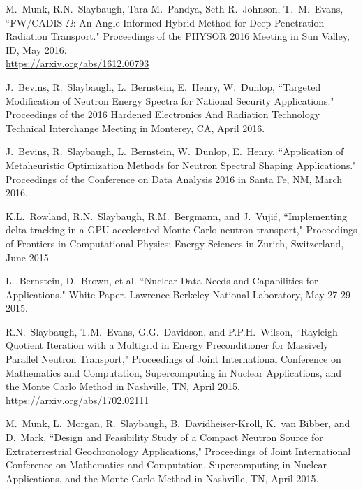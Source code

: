 \begin{bibsection}
\item M.\ Munk, R.N.\ Slaybaugh, Tara M.~Pandya, Seth R.~Johnson, T.~M.~Evans, ``FW/CADIS-$\Omega$: An Angle-Informed Hybrid Method for Deep-Penetration Radiation Transport." Proceedings of the PHYSOR 2016 Meeting in Sun Valley, ID, May 2016.\\
\url{https://arxiv.org/abs/1612.00793}

\item J.\ Bevins, R.\ Slaybaugh, L.\ Bernstein, E.\ Henry, W.\ Dunlop, ``Targeted Modification of Neutron Energy Spectra for National Security Applications." Proceedings of the 2016 Hardened Electronics And Radiation Technology Technical Interchange Meeting in Monterey, CA, April 2016. 

\item J.\ Bevins, R.\ Slaybaugh, L.\ Bernstein, W.\ Dunlop, E.\ Henry, ``Application of Metaheuristic Optimization Methods for Neutron Spectral Shaping Applications." Proceedings of the Conference on Data Analysis 2016 in Santa Fe, NM, March 2016. 

\item K.L.\ Rowland, R.N.\ Slaybaugh, R.M.\ Bergmann, and J.\ Vuji\'c, ``Implementing delta-tracking in a GPU-accelerated Monte Carlo neutron transport," Proceedings of Frontiers in Computational Physics: Energy Sciences in Zurich, Switzerland, June 2015. 

\item L.\ Bernstein, D.\ Brown, et al. ``Nuclear Data Needs and Capabilities for Applications." White Paper. Lawrence Berkeley National Laboratory, May 27-29 2015. 

\item  R.N.\ Slaybaugh, T.M.\ Evans, G.G.\ Davidson, and P.P.H.\ Wilson, ``Rayleigh Quotient Iteration with a Multigrid in Energy Preconditioner for Massively Parallel Neutron Transport," Proceedings of Joint International Conference on Mathematics and Computation, Supercomputing in Nuclear Applications, and the Monte Carlo Method in Nashville, TN, April 2015.\\
\url{https://arxiv.org/abs/1702.02111}

\item  M.\ Munk, L.\ Morgan, R.\ Slaybaugh, B.\ Davidheiser-Kroll, K.\ van Bibber, and D.\ Mark, ``Design and Feasibility Study of a Compact Neutron Source for Extraterrestrial Geochronology Applications," Proceedings of Joint International Conference on Mathematics and Computation, Supercomputing in Nuclear Applications, and the Monte Carlo Method in Nashville, TN, April 2015.


\end{bibsection}
